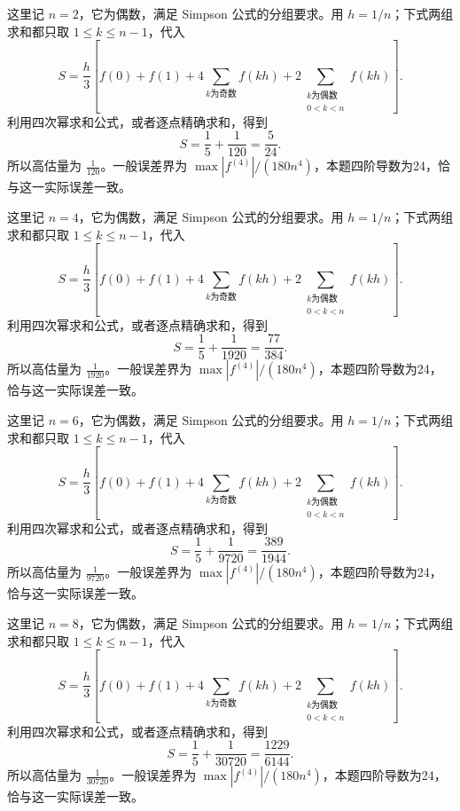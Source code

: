 \documentclass[12pt,fontset=fandol]{ctexart}
\begin{document}
\begin{solve}\label{ans:c18q7}
这里记 $n=2$，它为偶数，满足 Simpson 公式的分组要求。用 $h=1/n$；下式两组求和都只取 $1\le k\le n-1$，代入
\[
S=\frac h3\left[f(0)+f(1)+4\sum_{k\text{为奇数}}f(kh)+2\sum_{\substack{k\text{为偶数}\\0<k<n}}f(kh)\right].
\]
利用四次幂求和公式，或者逐点精确求和，得到
\[
S=\frac15+\frac{1}{120}=\frac{5}{24}.
\]
所以高估量为 $\frac{1}{120}$。一般误差界为 $\max|f^{(4)}|/(180n^4)$，本题四阶导数为24，恰与这一实际误差一致。
\end{solve}

\begin{solve}\label{ans:c18q8}
这里记 $n=4$，它为偶数，满足 Simpson 公式的分组要求。用 $h=1/n$；下式两组求和都只取 $1\le k\le n-1$，代入
\[
S=\frac h3\left[f(0)+f(1)+4\sum_{k\text{为奇数}}f(kh)+2\sum_{\substack{k\text{为偶数}\\0<k<n}}f(kh)\right].
\]
利用四次幂求和公式，或者逐点精确求和，得到
\[
S=\frac15+\frac{1}{1920}=\frac{77}{384}.
\]
所以高估量为 $\frac{1}{1920}$。一般误差界为 $\max|f^{(4)}|/(180n^4)$，本题四阶导数为24，恰与这一实际误差一致。
\end{solve}

\begin{solve}\label{ans:c18q9}
这里记 $n=6$，它为偶数，满足 Simpson 公式的分组要求。用 $h=1/n$；下式两组求和都只取 $1\le k\le n-1$，代入
\[
S=\frac h3\left[f(0)+f(1)+4\sum_{k\text{为奇数}}f(kh)+2\sum_{\substack{k\text{为偶数}\\0<k<n}}f(kh)\right].
\]
利用四次幂求和公式，或者逐点精确求和，得到
\[
S=\frac15+\frac{1}{9720}=\frac{389}{1944}.
\]
所以高估量为 $\frac{1}{9720}$。一般误差界为 $\max|f^{(4)}|/(180n^4)$，本题四阶导数为24，恰与这一实际误差一致。
\end{solve}

\begin{solve}\label{ans:c18q10}
这里记 $n=8$，它为偶数，满足 Simpson 公式的分组要求。用 $h=1/n$；下式两组求和都只取 $1\le k\le n-1$，代入
\[
S=\frac h3\left[f(0)+f(1)+4\sum_{k\text{为奇数}}f(kh)+2\sum_{\substack{k\text{为偶数}\\0<k<n}}f(kh)\right].
\]
利用四次幂求和公式，或者逐点精确求和，得到
\[
S=\frac15+\frac{1}{30720}=\frac{1229}{6144}.
\]
所以高估量为 $\frac{1}{30720}$。一般误差界为 $\max|f^{(4)}|/(180n^4)$，本题四阶导数为24，恰与这一实际误差一致。
\end{solve}
\end{document}
